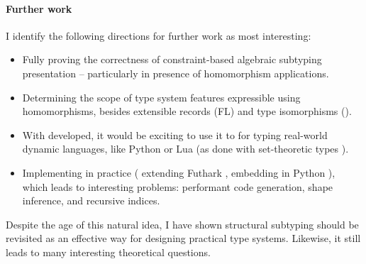 \paragraph{Further work}
I identify the following directions for further work as most interesting: \begin{itemize}
    \item Fully proving the correctness of constraint-based algebraic subtyping presentation -- particularly in presence of homomorphism applications. 
    \item Determining the scope of type system features expressible using homomorphisms, besides extensible records (FL) and type isomorphisms (\starr{}).
    \item With \inference{} developed, it would be exciting to use it to for typing real-world dynamic languages, like Python or Lua (as done with set-theoretic types \cite{set-theoretic-types-for-elixir, set-theoretic-types-for-erlang, castagna-dynamic}).
    \item Implementing \starr{} in practice (\eg{} extending Futhark \cite{futhark}, embedding in Python \cite{ein}), which leads to interesting problems: performant code generation, shape inference, and recursive indices.
\end{itemize}

Despite the age of this natural idea, I have shown structural subtyping should be revisited as an effective way for designing practical type systems. Likewise, it still leads to many interesting theoretical questions.